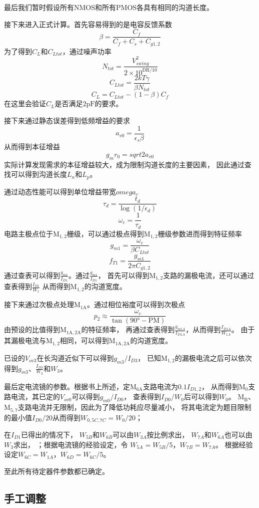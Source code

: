 \documentclass[a4paper]{article}
\newcommand{\upF}{\si{\pico\farad}}
\newcommand{\udeg}{\si{\degree}}
\newcommand{\dM}[1]{\mathrm{M}_\mathrm{#1}}
\newcommand{\DM}[1]{$\dM{#1}$}
\begin{document}
最后我们暂时假设所有NMOS和所有PMOS各具有相同的沟道长度。

接下来进入正式计算。首先容易得到的是电容反馈系数
$$\beta=\frac{C_f}{C_f+C_s+C_{g1,2}}$$
为了得到$C_L$和$C_{Ltot}$，通过噪声功率
$$N_{tot}=\frac{V_{swing}^2}{2\times10^{\mathrm{DR}/10}}$$
$$C_{Ltot}=\frac{2kT\gamma}{\beta N_{tot}}$$
$$C_L=C_{Ltot}-(1-\beta)C_f$$
在这里会验证$C_L$是否满足$2\upF$的要求。

接下来通过静态误差得到低频增益的要求
$$a_{v0}=\frac{1}{\epsilon_s\beta}$$
从而得到本征增益
$$g_mr_0=sqrt{2a_{v0}}$$
实际计算发现需求的本征增益较大，成为限制沟道长度的主要因素，
因此通过查找可以得到沟道长度$L_n$和$L_p$。

通过动态性能可以得到单位增益带宽$omega_c$
$$\tau_d=\frac{t_d}{\log(1/\epsilon_d)}$$
$$\omega_c=\frac{1}{\tau_d}$$
电路主极点位于\DM{1,2}栅级，可以通过极点得到\DM{1,2}栅级参数进而得到特征频率
$$g_{m1}=\frac{\omega_c}{\beta C_{Ltot}}$$
$$f_{T1}=\frac{g_{m1}}{2\pi C_{g1,2}}$$
通过查表可以得到$\frac{g_{m1}}{I_{D1}}$。通过$\frac{g_{m1}}{I_{D1}}$，
首先可以得到\DM{1,2}支路的漏极电流，还可以通过查表得到$\frac{I_{D1}}{W_1}$
从而得到\DM{1,2}的沟道宽度。

接下来通过次极点处理\DM{1A}。通过相位裕度可以得到次极点
$$p_2\approx\frac{\omega_c}{\tan(90\udeg-\mathrm{PM})}$$
由预设的比值得到\DM{1A,2A}的特征频率，
再通过查表得到$\frac{g_{m1A}}{I_{D1A}}$，从而得到$\frac{I_{D1A}}{W_{1A}}$。
由于其漏极电流与\DM{1,2}相同，可以得到\DM{1A,2A}的沟道宽度。

已设的$V_{ov3}$在长沟道近似下可以得到$g_{m3}/I_{D3}$，
已知\DM{1,2}的漏极电流之后可以依次得到$g_{m3}$、$\frac{I_{D3}}{W_3}$和$W_3$。

最后定电流镜的参数。根据书上所述，定\DM{6A}支路电流为$0.1I_{D1,2}$，
从而得到\DM{0}支路电流，其已定的$V_{ov0}$可以得到$g_{m0}/I_{D0}$，
查表得到$I_{D0}/W_0$后可以得到$W_0$。
\DM{B}、\DM{5,7}支路电流并无限制，因此为了降低功耗应尽量减小，
将其电流定为题目限制的最小值$I_{D0}/20$从而得到$W_{0,5C,7C}=W_0/20$；

在$I_{D1}$已得出的情况下，
$W_{5B}$和$W_{6B}$可以由$W_{3A}$按比例求出，
$W_{7A}$和$W_{6A}$也可以由$W_3$求出，
；根据电流镜的经验设定，令
$W_{5A}=W_{5B}/5$，$W_{7B}=W_{7A}$。
根据经验设定$W_{6C}=W_{1A}$，$W_{6D}=W_{6C}/5$。

至此所有待定器件参数都已确定。


\subsection{手工调整}
\end{document}
